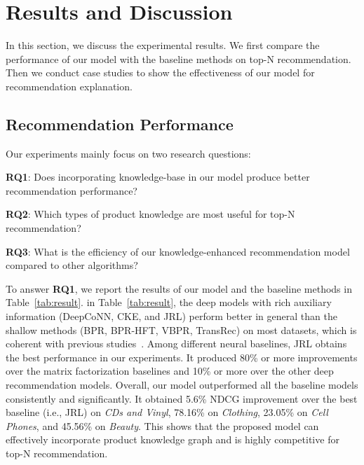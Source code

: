 \documentclass[algorithms,article,accept,moreauthors,pdftex,10pt,a4paper]{Definitions/mdpi}
\begin{document}
\fi



\section{Results and Discussion}\label{sec:results}

In this section, we discuss the experimental results. 
We first compare the performance of our model with the baseline methods on top-N recommendation.
Then we conduct case studies to show the effectiveness of our model for recommendation explanation. 

\subsection{Recommendation Performance}



\noindent
Our experiments mainly focus on two research questions:

\vspace{6 pt} 

\hspace{-1cm} \textbf{RQ1}: Does incorporating knowledge-base in our model produce better recommendation performance?

\hspace{-1cm} \textbf{RQ2}: Which types of product knowledge are most useful for top-N recommendation? 

\hspace{-1cm} \textbf{RQ3}: What is the efficiency of our knowledge-enhanced recommendation model compared to other algorithms?





\vspace{6 pt} To answer \textbf{RQ1}, we report the results of our model and the baseline methods in Table~\ref{tab:result}.
 in Table~\ref{tab:result}, the deep models with rich auxiliary information (DeepCoNN, CKE, and JRL) perform better in general than the shallow methods (BPR, BPR-HFT, VBPR, TransRec) on most datasets, which is coherent with previous studies~\cite{zhang2016collaborativekdd,zheng2017joint,zhang2017joint}.
Among different neural baselines, JRL obtains the best performance in our experiments.
It produced 80\% or more improvements over the matrix factorization baselines and 10\% or more over the other deep recommendation models.
Overall, our model outperformed all the baseline models consistently and significantly. 
It obtained 5.6\% NDCG improvement over the best baseline (i.e., JRL) on \textit{CDs and Vinyl}, 78.16\% on \textit{Clothing}, 23.05\% on \textit{Cell Phones}, and 45.56\% on \textit{Beauty}.
This shows that the proposed model can effectively incorporate product knowledge graph and is highly competitive for top-N recommendation. 
\end{document}
